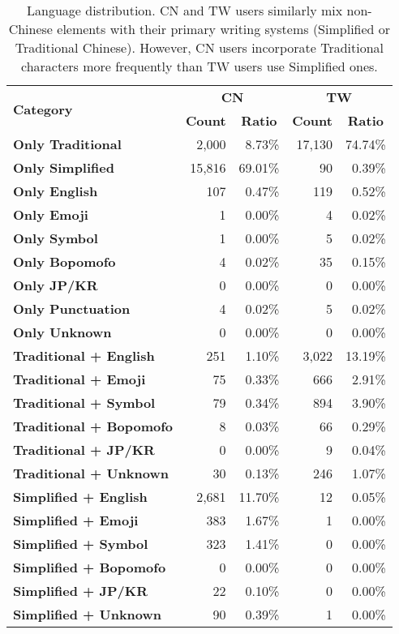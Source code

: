 \begin{table}[]
\centering
\footnotesize
\addtolength{\tabcolsep}{-1.2mm}
\begin{tabular}{@{}l@{\kern0pt}rrrr@{}}
\toprule
\multirow{2}{*}{\textbf{Category}} & \multicolumn{2}{c}{\textbf{CN}} & \multicolumn{2}{c}{\textbf{TW}} \\ \cmidrule(lr){2-3} \cmidrule(lr){4-5}
 & \multicolumn{1}{c}{\textbf{Count}} & \multicolumn{1}{c}{\textbf{Ratio}} & \multicolumn{1}{c}{\textbf{Count}} & \multicolumn{1}{c}{\textbf{Ratio}} \\ \midrule
\textbf{Only Traditional} & 2,000 & 8.73\% & 17,130 & 74.74\% \\
\textbf{Only Simplified} & 15,816 & 69.01\% & 90 & 0.39\% \\
\textbf{Only English }& 107 & 0.47\% & 119 & 0.52\% \\
\textbf{Only Emoji }& 1 & 0.00\% & 4 & 0.02\% \\
\textbf{Only Symbol }& 1 & 0.00\% & 5 & 0.02\% \\
\textbf{Only Bopomofo} & 4 & 0.02\% & 35 & 0.15\% \\
\textbf{Only JP/KR} & 0 & 0.00\% & 0 & 0.00\% \\
\textbf{Only Punctuation} & 4 & 0.02\% & 5 & 0.02\% \\
\textbf{Only Unknown} & 0 & 0.00\% & 0 & 0.00\% \\ \midrule
\textbf{Traditional + English} & 251 & 1.10\% & 3,022 & 13.19\% \\
\textbf{Traditional + Emoji} & 75 & 0.33\% & 666 & 2.91\% \\
\textbf{Traditional + Symbol} & 79 & 0.34\% & 894 & 3.90\% \\
\textbf{Traditional + Bopomofo} & 8 & 0.03\% & 66 & 0.29\% \\
\textbf{Traditional + JP/KR} & 0 & 0.00\% & 9 & 0.04\% \\
\textbf{Traditional + Unknown} & 30 & 0.13\% & 246 & 1.07\% \\ \midrule
\textbf{Simplified + English} & 2,681 & 11.70\% & 12 & 0.05\% \\
\textbf{Simplified + Emoji} & 383 & 1.67\% & 1 & 0.00\% \\
\textbf{Simplified + Symbol} & 323 & 1.41\% & 0 & 0.00\% \\
\textbf{Simplified + Bopomofo} & 0 & 0.00\% & 0 & 0.00\% \\
\textbf{Simplified + JP/KR} & 22 & 0.10\% & 0 & 0.00\% \\
\textbf{Simplified + Unknown} & 90 & 0.39\% & 1 & 0.00\% \\ \bottomrule
\end{tabular}
\addtolength{\tabcolsep}{+1.2mm}
\caption{Language distribution. CN and TW users similarly mix non-Chinese elements with their primary writing systems (Simplified or Traditional Chinese). However, CN users incorporate Traditional characters more frequently than TW users use Simplified ones.}
\label{tab:language-distribution}
\end{table}




